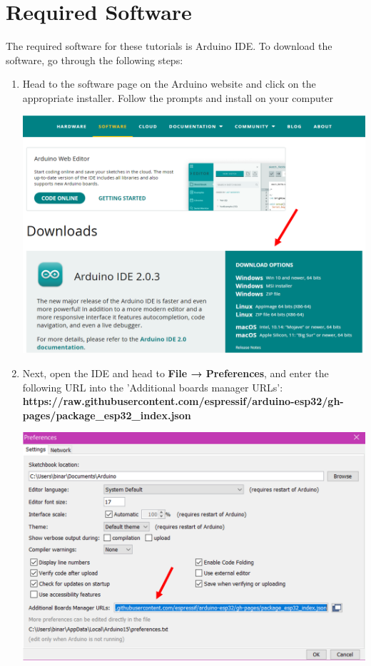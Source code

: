 \documentclass[a4paper,12pt]{report}
\newcommand{\imageWidth}{140mm}
\begin{document}
\section*{Required Software}
The required software for these tutorials is Arduino IDE. To download the software, go through the following steps:
    \begin{enumerate}
        \item Head to the software page on the Arduino website and click on the appropriate installer. Follow the prompts and install on your computer
        
        \begin{center}
            \includegraphics[width = \imageWidth]{Assets/Downloads_page.png}
        \end{center}
        
        \item Next, open the IDE and head to \textbf{File → Preferences}, and enter the following URL into the 'Additional boards manager URLs':
        \textbf{https://raw.githubusercontent.com/espressif/arduino-esp32/gh-pages/package\_esp32\_index.json}
        
        \begin{center}
            \includegraphics[width = \imageWidth]{Assets/Esp_url.png}
        \end{center}
        

\end{enumerate}
\end{document}

